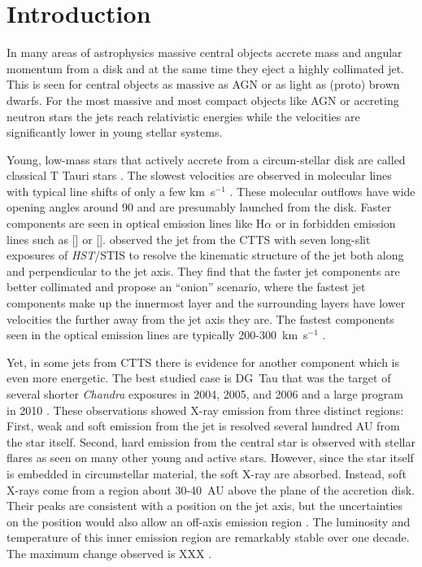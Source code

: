 \section{Introduction} 
In many areas of astrophysics massive central objects accrete mass and angular momentum from a disk and at the same time they eject a highly collimated jet. This is seen for central objects as massive as AGN or as light as (proto) brown dwarfs. For the most massive and most compact objects like AGN or accreting neutron stars the jets reach relativistic energies while the velocities are significantly lower in young stellar systems. 

Young, low-mass stars that actively accrete from a circum-stellar disk are called classical T Tauri stars \citep[for a review see][]{2013AN....334...67G}. The slowest velocities are observed in molecular lines with typical line shifts of only a few km~s$^{-1}$ \citep{2008ApJ...676..472B}. These molecular outflows have wide opening angles around 90\degree{} \citep[e.g.][]{2013A&A...557A.110S} and are presumably launched from the disk. Faster components are seen in optical emission lines like H$\alpha$ or in forbidden emission lines such as [] or []. \citet{2000ApJ...537L..49B} observed the jet from the CTTS  with seven long-slit exposures of \emph{HST}/STIS to resolve the kinematic structure of the jet both along and perpendicular to the jet axis. They find that the faster jet components are better collimated and propose an ``onion'' scenario, where the fastest jet components make up the innermost layer and the surrounding layers have lower velocities the further away from the jet axis they are. The fastest components seen in the optical emission lines are typically 200-300~km~s$^{-1}$ \citep{2004Ap&SS.292..651B,2008ApJ...689.1112C,2013A&A...550L...1S}.

Yet, in some jets from CTTS there is evidence for another component which is even more energetic. The best studied case is DG~Tau that was the target of several shorter \emph{Chandra} exposures in 2004, 2005, and 2006 and a large program in 2010 \citep{2005ApJ...626L..53G,2008A&A...478..797G,2011ASPC..448..617G}. These observations showed X-ray emission from three distinct regions: First, weak and soft emission from the jet is resolved several hundred AU from the star itself. Second, hard emission from the central star is observed with stellar flares as seen on many other young and active stars. However, since the star itself is embedded in circumstellar material, the soft X-ray are absorbed. Instead, soft X-rays come from a region about 30-40~AU above the plane of the accretion disk. Their peaks are consistent with a position on the jet axis, but the uncertainties on the position would also allow an off-axis emission region \citep{2008A&A...488L..13S}. The luminosity and temperature of this inner emission region are remarkably stable over one decade. The maximum change observed is XXX \citep{SchneiderDGTauXray}.

